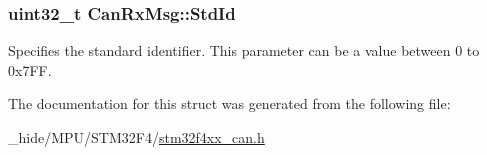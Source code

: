 \subsubsection[{Std\+Id}]{\setlength{\rightskip}{0pt plus 5cm}uint32\+\_\+t Can\+Rx\+Msg\+::\+Std\+Id}\label{struct_can_rx_msg_a62769e18836146f71238bee6b43b531e}
Specifies the standard identifier. This parameter can be a value between 0 to 0x7\+F\+F. 

The documentation for this struct was generated from the following file\+:\begin{DoxyCompactItemize}
\item 
\+\_\+hide/\+M\+P\+U/\+S\+T\+M32\+F4/\hyperlink{stm32f4xx__can_8h}{stm32f4xx\+\_\+can.\+h}\end{DoxyCompactItemize}
